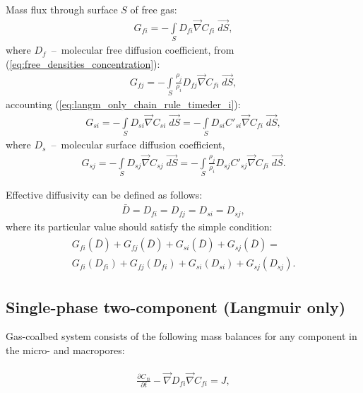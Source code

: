 \documentclass[a4paper,14pt,english]{extreport}
\begin{document}
Mass flux through surface $S$ of free gas:
\begin{eqnarray}
	\label{eq:flux_free_i}
	G_{fi} = - \int \limits_{S} D_{fi} \vec{\nabla}C_{fi} \; \vec{dS},
\end{eqnarray}
where $D_{f}$~--~molecular free diffusion coefficient, from (\ref{eq:free_densities_concentration}):
\begin{eqnarray}
	\label{eq:flux_free_j}
	G_{fj} = -\int \limits_{S} \frac{\rho_j}{\rho_i} D_{fj} \vec{\nabla}C_{fi} \; \vec{dS},
\end{eqnarray}
accounting (\ref{eq:langm_only_chain_rule_timeder_i}):
\begin{eqnarray}
	\label{eq:flux_surface_i}
	G_{si} = - \int \limits_{S} D_{si} \vec\nabla C_{si} \; \vec{dS} = - \int \limits_{S} D_{si}  C'_{si}\vec\nabla C_{fi} \; \vec{dS},
\end{eqnarray}
where $D_{s}$~--~molecular surface diffusion coefficient,
\begin{eqnarray}
	\label{eq:flux_surface_j}
	G_{sj} = - \int \limits_{S} D_{sj} \vec\nabla C_{sj} \; \vec{dS} = - \int \limits_{S} \frac{\rho_j}{\rho_i}D_{sj}  C'_{sj}\vec\nabla C_{fi} \; \vec{dS}.
\end{eqnarray}

Effective diffusivity can be defined as follows:
\begin{eqnarray}
	\label{eq:effective_diffusivity}
\bar{D} = D_{fi} =D_{fj} =D_{si} =D_{sj},
\end{eqnarray}
where its particular value should satisfy the simple condition:
\begin{eqnarray}
	\begin{gathered}
	\label{eq:effective_diffusivity_condition}
	G_{fi}\left(\bar{D} \right) + G_{fj}\left(\bar{D} \right)  + G_{si}\left(\bar{D} \right)  + G_{sj}\left(\bar{D} \right) =\\
	G_{fi}\left(D_{fi} \right) + G_{fj}\left(D_{fi} \right)  + G_{si}\left(D_{si}\right)  + G_{sj}\left(D_{sj} \right).
	\end{gathered}
\end{eqnarray}

 \subsection*{Single-phase two-component (Langmuir only)}
Gas-coalbed system consists of the following mass balances for any component in the micro- and macropores:

\begin{eqnarray}
\begin{gathered}
\label{eq:langm_only_free_diffusivity_differential}
\frac{\partial C_{fi}}{\partial t} - \vec{\nabla} D_{fi} \vec{\nabla}C_{fi} = J,
\end{gathered}
\end{eqnarray}
\end{document}
